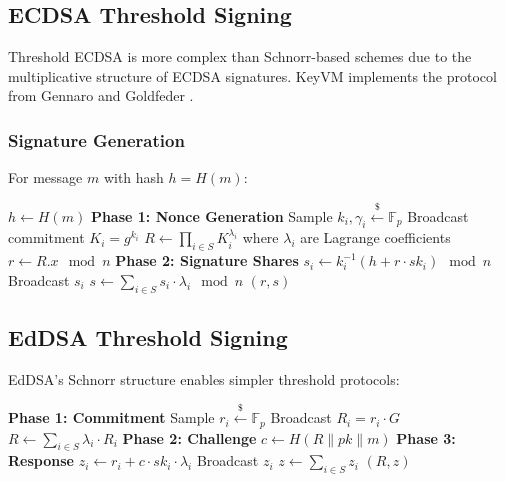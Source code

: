\documentclass[11pt,twocolumn]{article}
\begin{document}
\subsection{ECDSA Threshold Signing}

Threshold ECDSA is more complex than Schnorr-based schemes due to the multiplicative structure of ECDSA signatures. KeyVM implements the protocol from Gennaro and Goldfeder \cite{gennaro2018fast}.

\subsubsection{Signature Generation}

For message $m$ with hash $h = H(m)$:

\begin{algorithm}
\caption{Threshold ECDSA Signing}
\label{alg:threshold-ecdsa}
\begin{algorithmic}[1]
    \State $h \gets H(m)$
    \State \textbf{Phase 1: Nonce Generation}
        \State Sample $k_i, \gamma_i \xleftarrow{\$} \mathbb{F}_p$
        \State Broadcast commitment $K_i = g^{k_i}$
    \EndFor
    \State $R \gets \prod_{i \in S} K_i^{\lambda_i}$ where $\lambda_i$ are Lagrange coefficients
    \State $r \gets R.x \mod n$
    \State \textbf{Phase 2: Signature Shares}
        \State $s_i \gets k_i^{-1} (h + r \cdot sk_i) \mod n$
        \State Broadcast $s_i$
    \EndFor
    \State $s \gets \sum_{i \in S} s_i \cdot \lambda_i \mod n$
    \State \Return $(r, s)$
\EndProcedure
\end{algorithmic}
\end{algorithm}

\subsection{EdDSA Threshold Signing}

EdDSA's Schnorr structure enables simpler threshold protocols:

\begin{algorithm}
\caption{Threshold EdDSA Signing}
\label{alg:threshold-eddsa}
\begin{algorithmic}[1]
    \State \textbf{Phase 1: Commitment}
        \State Sample $r_i \xleftarrow{\$} \mathbb{F}_p$
        \State Broadcast $R_i = r_i \cdot G$
    \EndFor
    \State $R \gets \sum_{i \in S} \lambda_i \cdot R_i$
    \State \textbf{Phase 2: Challenge}
    \State $c \gets H(R \| pk \| m)$
    \State \textbf{Phase 3: Response}
        \State $z_i \gets r_i + c \cdot sk_i \cdot \lambda_i$
        \State Broadcast $z_i$
    \EndFor
    \State $z \gets \sum_{i \in S} z_i$
    \State \Return $(R, z)$
\EndProcedure
\end{algorithmic}
\end{algorithm}
\end{document}
